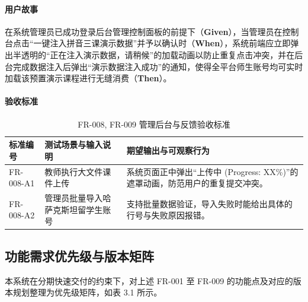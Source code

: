 \paragraph{用户故事}
在系统管理员已成功登录后台管理控制面板的前提下（\textbf{Given}），当管理员在控制台点击“一键注入拼音三课演示数据”并予以确认时（\textbf{When}），系统前端应立即弹出半透明的“正在注入演示数据，请稍候”的加载动画以防止重复点击冲突，并在后台完成数据注入后弹出“演示数据注入成功”的通知，使得全平台师生账号均可实时加载该预置演示课程进行无缝消费（\textbf{Then}）。
\paragraph{验收标准}
\begin{table}[H]
\centering
\caption{FR-008, FR-009 管理后台与反馈验收标准}
\begin{tabularx}{\textwidth}{l p{5.5cm} X}
\toprule
\textbf{标准编号} & \textbf{测试场景与输入说明} & \textbf{期望输出与可观察行为} \\
\midrule
FR-008-A1 & 教师执行大文件课件上传 & 系统页面正中弹出“上传中 (Progress: XX\%)”的遮罩动画，防范用户的重复提交冲突。 \\
FR-008-A2 & 管理员批量导入哈萨克斯坦留学生账号 & 支持批量数据验证，导入失败时能给出具体的行号与失败原因报错。 \\
\bottomrule
\end{tabularx}
\end{table}

\subsection{功能需求优先级与版本矩阵}
本系统在分期快速交付的约束下，对上述 FR-001 至 FR-009 的功能点及对应的版本规划整理为优先级矩阵，如表 3.1 所示。

